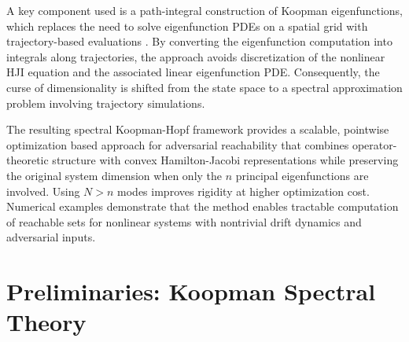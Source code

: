 \documentclass[letterpaper, 10 pt, conference]{ieeeconf}
\theoremstyle{plain}
\theoremstyle{definition}
\begin{document}
A key component used is a path-integral construction of Koopman eigenfunctions, which replaces the need to solve eigenfunction PDEs on a spatial grid with trajectory-based evaluations \cite{deka2023path}. By converting the eigenfunction computation into integrals along  trajectories, the approach avoids discretization of the nonlinear HJI equation and the associated linear eigenfunction PDE. 
Consequently, the curse of dimensionality is shifted from the state space to a spectral approximation problem involving trajectory simulations.

The resulting spectral Koopman-Hopf framework provides a scalable, pointwise optimization based approach for adversarial reachability that combines operator-theoretic structure with convex Hamilton-Jacobi representations while preserving the original system dimension when only the $n$ principal eigenfunctions are involved. Using $N>n$ modes improves rigidity at higher optimization cost. 
Numerical examples demonstrate that the method enables tractable computation of reachable sets for nonlinear systems with nontrivial drift dynamics and adversarial inputs.










\section{Preliminaries: Koopman Spectral Theory}
\end{document}
